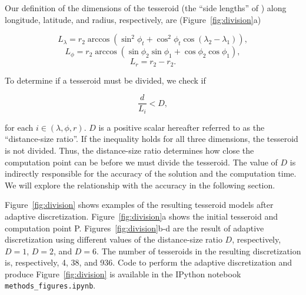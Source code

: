 \documentclass[paper,twocolumn]{geophysics}
\begin{document}
Our definition of the dimensions of the tesseroid
(the ``side lengths'' of \citet{Li2011})
along longitude, latitude, and radius, respectively, are
(Figure~\ref{fig:division}a)

\begin{equation}
    L_\lambda = r_2 \arccos(\sin^2\phi_t +
        \cos^2\phi_t\cos(\lambda_2 - \lambda_1)),
    \label{eq:sizelon}
\end{equation}
\begin{equation}
    L_\phi = r_2 \arccos(\sin\phi_2\sin\phi_1 + \cos\phi_2\cos\phi_1),
\end{equation}
\begin{equation}
    L_r = r_2 - r_2.
    \label{eq:sizer}
\end{equation}

To determine if a tesseroid must be divided,
we check if

\begin{equation}
    \frac{d}{L_i} < D,
    \label{eq:condition}
\end{equation}

\noindent
for each $i \in (\lambda, \phi, r)$.
$D$ is a positive scalar
hereafter referred to as the ``distance-size ratio''.
If the inequality holds for all three dimensions,
the tesseroid is not divided.
Thus, the distance-size ratio determines
how close the computation point can be
before we must divide the tesseroid.
The value of $D$ is indirectly responsible for
the accuracy of the solution and the computation time.
We will explore the relationship with the accuracy in the following section.

Figure~\ref{fig:division} shows examples of
the resulting tesseroid models after adaptive discretization.
Figure~\ref{fig:division}a shows
the initial tesseroid and computation point P.
Figures~\ref{fig:division}b-d are
the result of adaptive discretization using
different values of the distance-size ratio $D$,
respectively,
$D=1$, $D=2$, and $D=6$.
The number of tesseroids in the resulting discretization is, respectively,
4, 38, and 936.
Code to perform the adaptive discretization
and produce Figure~\ref{fig:division} is available in
the IPython notebook \texttt{methods\_figures.ipynb}.
\end{document}
